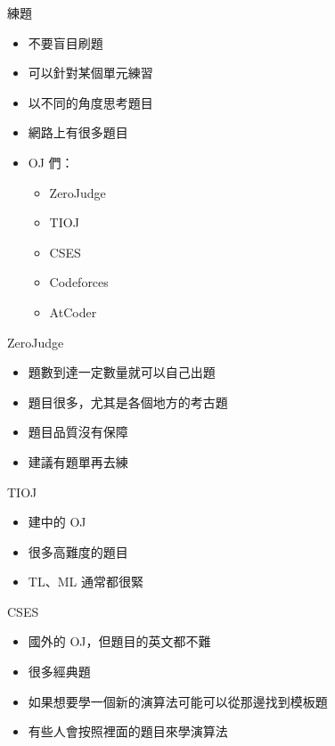 \documentclass[aspectratio=169]{beamer}
\begin{document}
	\begin{frame}{練題}
		\begin{itemize}
			\item<1-> 不要盲目刷題 
			\item<2-> 可以針對某個單元練習
			\item<2-> 以不同的角度思考題目
			\item<3-> 網路上有很多題目
			\item<3-> OJ 們：
			\begin{itemize}
				\item ZeroJudge
				\item TIOJ
				\item CSES
				\item Codeforces
				\item AtCoder
			\end{itemize}
		\end{itemize}
	\end{frame}

	\begin{frame}{ZeroJudge}
		\begin{itemize}
			\item 題數到達一定數量就可以自己出題
			\item 題目很多，尤其是各個地方的考古題
			\item 題目品質沒有保障
			\item 建議有題單再去練
		\end{itemize}
	\end{frame}

	\begin{frame}{TIOJ}
		\begin{itemize}
			\item 建中的 OJ
			\item 很多高難度的題目
			\item TL、ML 通常都很緊
		\end{itemize}
	\end{frame}

	\begin{frame}{CSES}
		\begin{itemize}
			\item 國外的 OJ，但題目的英文都不難
			\item 很多經典題
			\item 如果想要學一個新的演算法可能可以從那邊找到模板題
			\item 有些人會按照裡面的題目來學演算法
		\end{itemize}
	\end{frame}
\end{document}
